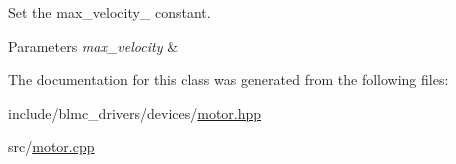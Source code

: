 Set the max\+\_\+velocity\+\_\+ constant. 


\begin{DoxyParams}{Parameters}
{\em max\+\_\+velocity} & \\
\hline
\end{DoxyParams}


The documentation for this class was generated from the following files\+:\begin{DoxyCompactItemize}
\item 
include/blmc\+\_\+drivers/devices/\hyperlink{motor_8hpp}{motor.\+hpp}\item 
src/\hyperlink{motor_8cpp}{motor.\+cpp}\end{DoxyCompactItemize}

